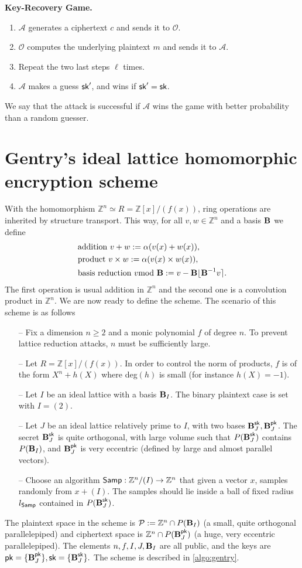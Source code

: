 \documentclass[11pt]{article}
\theoremstyle{plain}
\theoremstyle{definition}
\theoremstyle{remark}
\newcommand{\ZZ}{\mathbb{Z}}      %
\newcommand{\sk}{{\sf sk}}
\newcommand{\pk}{{\sf pk}}
\newcommand{\BB}{{\mbox{\bf B}}}
\newcommand{\Samp}{{\sf Samp}}
\begin{document}
{\bf Key-Recovery Game.} 
\begin{enumerate}
	\item $\mathcal A$ generates a ciphertext $c$ and sends it to $\mathcal O$.
	\item $\mathcal O$ computes the underlying plaintext $m$ and sends it to $\mathcal A$.
	\item Repeat the two last steps $\ell$ times.
	\item $\mathcal{A}$ makes a guess $\sk'$, and wins if $\sk'=\sk$.
\end{enumerate}
We say that the attack is successful if $\mathcal{A}$ wins the game with better probability than a random guesser. 

\section{Gentry's ideal lattice homomorphic encryption scheme}
With the homomorphism $\ZZ^n\simeq R=\ZZ[x]/(f(x))$, ring operations are inherited by structure transport. This way, for all $v,w\in \ZZ^n$ and a basis $\BB$ we define
\begin{align*}
&\mbox{addition  }v+w:=\alpha(v(x)+w(x)),\\
&\mbox{product  }v\times w:=\alpha(v(x)\times w(x)),\\
&\mbox{basis reduction }v\!\!\!\!\mod\BB := v - \BB \lfloor \BB^{-1}v\rceil.
\end{align*}
The first operation is usual addition in $\ZZ^n$ and the second one is a convolution product in $\ZZ^n$. We are now ready to define the scheme. The scenario of this scheme is as follows

\begin{itemize}
	\item[--]  Fix a dimension $n\geq 2$ and a monic polynomial $f$ of degree $n$. To prevent lattice reduction attacks, $n$ must be sufficiently large.
	\item[--]  Let $R=\ZZ[x]/(f(x))$. In order to control the norm of products, $f$ is of the form $X^n+h(X)$ where deg$(h)$ is small (for instance $h(X)=-1$).
	\item[--]  Let $I$ be an ideal lattice with a basis $\BB_I$. The binary plaintext case is set with $I=(2)$.
	\item[--]  Let $J$ be an ideal lattice relatively prime to $I$, with two bases $\BB_J^{\sk},\BB_J^{\pk}$. The secret $\BB_J^\sk$ is quite orthogonal, with large volume such that $P(\BB_J^\sk)$ contains $P(\BB_I)$, and $\BB_J^\pk$ is very eccentric (defined by large and almost parallel vectors).
	\item[--]  Choose an algorithm $\Samp:\ZZ^n/(I)\to\ZZ^n$ that given a vector $x$, samples randomly from $x+(I)$. The samples should lie inside a ball of fixed radius $l_\Samp$ contained in $P(\BB_J^\sk)$.
\end{itemize}
The plaintext space in the scheme is $\mathcal{P}:=\ZZ^n\cap P(\BB_I)$ (a small, quite orthogonal parallelepiped) and ciphertext space is $\ZZ^n\cap P(\BB_J^\pk)$ (a huge, very eccentric parallelepiped). The elements $n,f,I,J,\BB_I$ are all public, and the keys are $\pk = \{\BB_J^\pk\}, \sk = \{\BB_J^\sk\}.$
The scheme is described in \ref{algo:gentry}.
\end{document}
